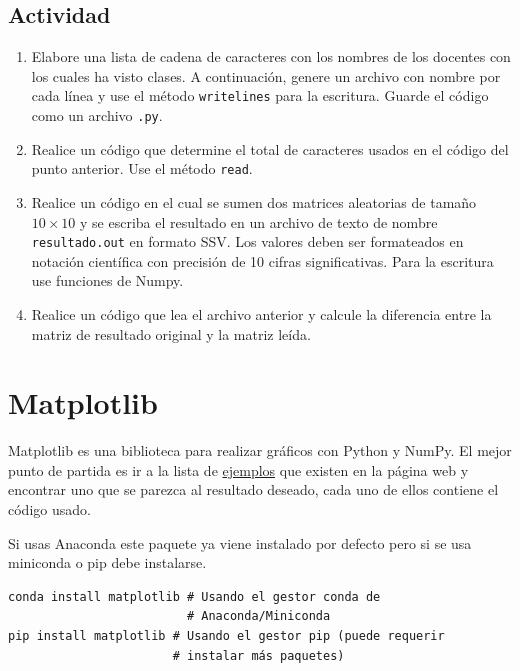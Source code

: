 \subsection{Actividad}

\begin{enumerate}
\item Elabore una lista de cadena de caracteres con los nombres de los docentes con los cuales ha visto clases. A continuación,
        genere un archivo con nombre por cada línea y use el método \texttt{writelines} para la escritura. Guarde el código como un
        archivo \texttt{.py}.
\item Realice un código que determine el total de caracteres usados en el código del punto anterior. Use el método \texttt{read}.
\item Realice un código en el cual se sumen dos matrices aleatorias de tamaño \(10\times 10\) y se escriba el resultado en un archivo
        de texto de nombre \texttt{resultado.out} en formato SSV. Los valores deben ser formateados en notación científica con precisión
        de 10 cifras significativas. Para la escritura use funciones de Numpy.
\item Realice un código que lea el archivo anterior y calcule la diferencia entre la matriz de resultado original y la matriz leída.
\end{enumerate}

\section{Matplotlib}

Matplotlib es una biblioteca para realizar gráficos con Python y NumPy.
El mejor punto de partida es ir a la lista de
\href{https://matplotlib.org/gallery/index.html}{ejemplos} que existen
en la página web y encontrar uno que se parezca al resultado deseado,
cada uno de ellos contiene el código usado.

Si usas Anaconda este paquete ya viene instalado por defecto pero si se
usa miniconda o pip debe instalarse.

\begin{listing}[H]
\begin{verbatim}
conda install matplotlib # Usando el gestor conda de
                         # Anaconda/Miniconda
pip install matplotlib # Usando el gestor pip (puede requerir
                       # instalar más paquetes)
\end{verbatim}
\end{listing}

